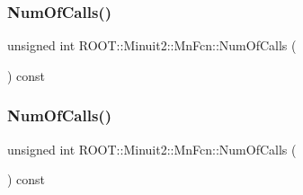 \subsubsection{\texorpdfstring{NumOfCalls()}{NumOfCalls()}\hspace{0.1cm}{\footnotesize\ttfamily [1/2]}}
{\footnotesize\ttfamily unsigned int R\+O\+O\+T\+::\+Minuit2\+::\+Mn\+Fcn\+::\+Num\+Of\+Calls (\begin{DoxyParamCaption}{ }\end{DoxyParamCaption}) const\hspace{0.3cm}{\ttfamily [inline]}}

\mbox{\label{classROOT_1_1Minuit2_1_1MnFcn_af8dc896f10dc8a53429260198cd0e1c5}} 
\subsubsection{\texorpdfstring{NumOfCalls()}{NumOfCalls()}\hspace{0.1cm}{\footnotesize\ttfamily [2/2]}}
{\footnotesize\ttfamily unsigned int R\+O\+O\+T\+::\+Minuit2\+::\+Mn\+Fcn\+::\+Num\+Of\+Calls (\begin{DoxyParamCaption}{ }\end{DoxyParamCaption}) const\hspace{0.3cm}{\ttfamily [inline]}}

